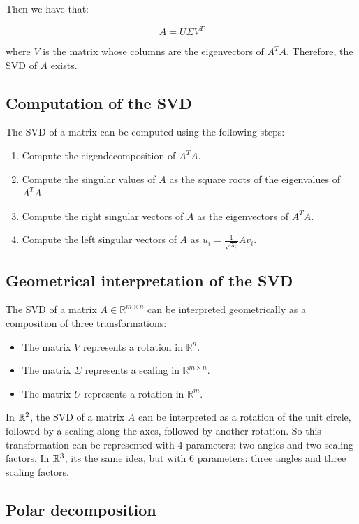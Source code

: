 Then we have that:

$$A = U \Sigma V^T$$

where $V$ is the matrix whose columns are the eigenvectors of $A^T A$. Therefore, the SVD of $A$ exists.

\subsection{Computation of the SVD}

The SVD of a matrix can be computed using the following steps:

\begin{enumerate}
    \item Compute the eigendecomposition of $A^T A$.
    \item Compute the singular values of $A$ as the square roots of the eigenvalues of $A^T A$.
    \item Compute the right singular vectors of $A$ as the eigenvectors of $A^T A$.
    \item Compute the left singular vectors of $A$ as $u_i = \frac{1}{\sqrt{\lambda_i}} A v_i$.
\end{enumerate}

\subsection{Geometrical interpretation of the SVD}

The SVD of a matrix $A \in \mathbb{R}^{m \times n}$ can be interpreted geometrically as a composition of three transformations:

\begin{itemize}
    \item The matrix $V$ represents a rotation in $\mathbb{R}^n$.
    \item The matrix $\Sigma$ represents a scaling in $\mathbb{R}^{m \times n}$.
    \item The matrix $U$ represents a rotation in $\mathbb{R}^m$.
\end{itemize}

In $\mathbb{R}^2$, the SVD of a matrix $A$ can be interpreted as a rotation of the unit circle, followed by a scaling along the axes, 
followed by another rotation. So this transformation can be represented with 4 parameters: two angles and two scaling factors.
In $\mathbb{R}^3$, its the same idea, but with 6 parameters: three angles and three scaling factors.

\subsection{Polar decomposition}

